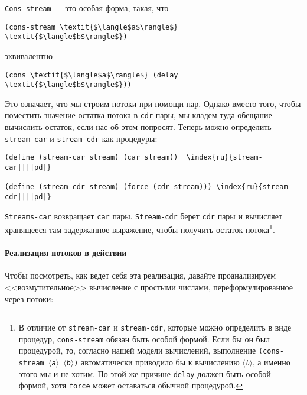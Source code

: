 {\tt Cons-stream}  --- это особая форма, такая, что

\begin{Verbatim}[fontsize=\small]
(cons-stream \textit{$\langle$a$\rangle$} \textit{$\langle$b$\rangle$})
\end{Verbatim}
эквивалентно
\begin{Verbatim}[fontsize=\small]
(cons \textit{$\langle$a$\rangle$} (delay \textit{$\langle$b$\rangle$}))
\end{Verbatim}

Это означает, что мы строим потоки при помощи пар.  Однако
вместо того, чтобы поместить значение остатка потока в {\tt cdr}
пары, мы кладем туда обещание вычислить остаток, если нас об этом
попросят.  Теперь можно определить {\tt stream-car} и
{\tt stream-cdr} как процедуры:

\begin{Verbatim}[fontsize=\small]
(define (stream-car stream) (car stream))  \index{ru}{stream-car||||pd|}

(define (stream-cdr stream) (force (cdr stream))) \index{ru}{stream-cdr||||pd|}
\end{Verbatim}

{\tt Streams-car} возвращает {\tt car}
пары. {\tt Stream-cdr} берет {\tt cdr} пары и вычисляет
хранящееся там задержанное выражение, чтобы получить остаток
потока\footnote{В отличие от {\tt stream-car} и
{\tt stream-cdr}, которые можно определить в виде процедур,
{\tt cons-stream} обязан быть особой формой.
Если бы он был
процедурой, то, согласно нашей модели вычислений, выполнение
{\tt (cons-stream \textit{$\langle$a$\rangle$} \textit{$\langle$b$\rangle$})}
автоматически приводило бы к вычислению \textit{$\langle$b$\rangle$}, а именно
этого мы и не хотим.  По этой же причине {\tt delay} должен
быть особой формой, хотя {\tt force} может оставаться обычной
процедурой.
}.

\paragraph{Реализация потоков в действии}


Чтобы посмотреть, как ведет себя эта реализация, давайте
проанализируем <<возмутительное>> вычисление с простыми числами,
переформулированное через потоки:

